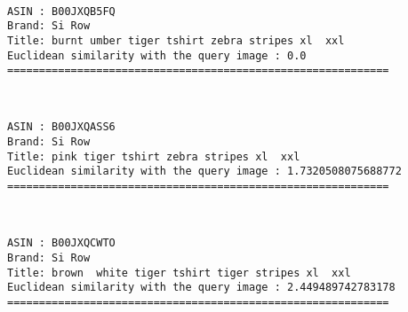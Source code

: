 \documentclass[11pt]{article}
\begin{document}
    \begin{center}
    \end{center}
    { \hspace*{\fill} \\}
    
    \begin{Verbatim}[commandchars=\\\{\}]
ASIN : B00JXQB5FQ
Brand: Si Row
Title: burnt umber tiger tshirt zebra stripes xl  xxl 
Euclidean similarity with the query image : 0.0
============================================================

    \end{Verbatim}

    \begin{center}
    \end{center}
    { \hspace*{\fill} \\}
    
    \begin{Verbatim}[commandchars=\\\{\}]
ASIN : B00JXQASS6
Brand: Si Row
Title: pink tiger tshirt zebra stripes xl  xxl 
Euclidean similarity with the query image : 1.7320508075688772
============================================================

    \end{Verbatim}

    \begin{center}
    \end{center}
    { \hspace*{\fill} \\}
    
    \begin{Verbatim}[commandchars=\\\{\}]
ASIN : B00JXQCWTO
Brand: Si Row
Title: brown  white tiger tshirt tiger stripes xl  xxl 
Euclidean similarity with the query image : 2.449489742783178
============================================================

    \end{Verbatim}

    \begin{center}
    \end{center}
    { \hspace*{\fill} \\}
    
\end{document}
